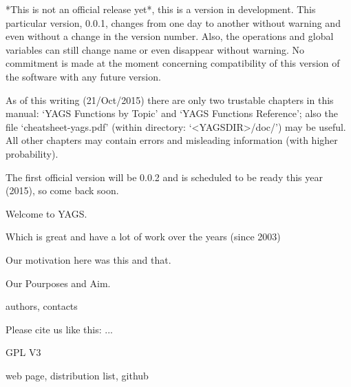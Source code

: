 

*This is not an official release yet*, this is a version in development. 
This particular version, 0.0.1, changes from one day to another without warning 
and even without a change in the version number. Also, the operations and 
global variables can still change name or even disappear without warning. 
No commitment is made at the moment concerning compatibility of this version of 
the software with any future version.

As of this writing (21/Oct/2015) there are only two trustable chapters in this manual: 
`YAGS Functions by Topic' and  `YAGS Functions Reference'; also the file 
`cheatsheet-yags.pdf' (within directory: `<YAGSDIR>/doc/') may be useful. 
All other chapters may contain errors and misleading information (with higher probability).

The first official version will be 0.0.2 and is scheduled to be ready this year (2015), 
so come back soon.



Welcome to YAGS.

Which is great and have a lot of work over the years (since 2003)

Our motivation here was this and that.

Our Pourposes and Aim.

authors, contacts



 Please cite us like this: ... 



GPL V3 



web page, distribution list, github


